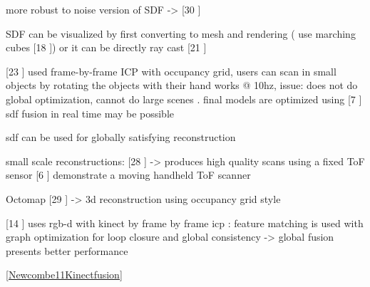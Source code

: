 more robust to noise version of SDF -> [30 \cite{Zach07Globally} ]

SDF can be visualized by first converting to mesh and rendering ( use marching cubes [18 \cite{Cubes87High}]) or it can be directly ray cast [21 \cite{Parker98Interactive}]

[23 \cite{Rusinkiewicz02Real}] used frame-by-frame ICP with occupancy grid, users can scan in small objects by rotating the objects with their hand
works @ 10hz, issue: does not do global optimization, cannot do large scenes . final models are optimized using [7 \cite{Curless96Volumetric}]
sdf fusion in real time may be possible

sdf can be used for globally satisfying reconstruction

small scale reconstructions:
	[28 \cite{Weise09Hand}] -> produces high quality scans using a fixed ToF sensor
	[6 \cite{Cui103d} ] demonstrate a moving handheld ToF scanner

Octomap [29 \cite{Wurm10Octomap}] -> 3d reconstruction using occupancy grid style 

[14 \cite{Henry10Rgb}] uses rgb-d with kinect by frame by frame icp : feature matching is used with graph optimization for loop closure and global consistency -> global fusion presents better performance








































\ref{Newcombe11Kinectfusion}

